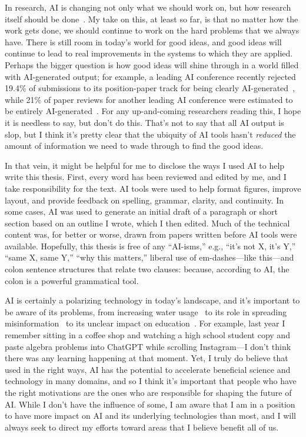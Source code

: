 In research, AI is changing not only what we should work on, but how research itself should be done~\cite{cheng2025barbariansgateaiupending}. My take on this, at least so far, is that no matter how the work gets done, we should continue to work on the hard problems that we always have. There is still room in today's world for good ideas, and good ideas will continue to lead to real improvements in the systems to which they are applied. Perhaps the bigger question is how good ideas will shine through in a world filled with AI-generated output; for example, a leading AI conference recently rejected 19.4\% of submissions to its position-paper track for being clearly AI-generated~\cite{neurips2026_ai_generated_papers}, while 21\% of paper reviews for another leading AI conference were estimated to be entirely AI-generated~\cite{pangram2025_iclr_reviews_ai}. For any up-and-coming researchers reading this, I hope it is needless to say, but don't do this. That's not to say that all AI output is slop, but I think it's pretty clear that the ubiquity of AI tools hasn't \textit{reduced} the amount of information we need to wade through to find the good ideas.

In that vein, it might be helpful for me to disclose the ways I used AI to help write this thesis. First, every word has been reviewed and edited by me, and I take responsibility for the text. AI tools were used to help format figures, improve layout, and provide feedback on spelling, grammar, clarity, and continuity. In some cases, AI was used to generate an initial draft of a paragraph or short section based on an outline I wrote, which I then edited. Much of the technical content was, for better or worse, drawn from papers written before AI tools were available. Hopefully, this thesis is free of any ``AI-isms,'' e.g., ``it's not X, it's Y,'' ``same X, same Y,'' ``why this matters,'' liberal use of em-dashes---like this---and colon sentence structures that relate two clauses: because, according to AI, the colon is a powerful grammatical tool.

AI is certainly a polarizing technology in today's landscape, and it's important to be aware of its problems, from increasing water usage~\cite{aczel2026environmental} to its role in spreading misinformation~\cite{zhou2023misinfo} to its unclear impact on education~\cite{fesler2026evidence}. For example, last year I remember sitting in a coffee shop and watching a high school student copy and paste algebra problems into ChatGPT while scrolling Instagram---I don't think there was any learning happening at that moment. Yet, I truly do believe that used in the right ways, AI has the potential to accelerate beneficial science and technology in many domains, and so I think it's important that people who have the right motivations are the ones who are responsible for shaping the future of AI. While I don't have the influence of some, I am aware that I am in a position to have more impact on AI and its underlying technologies than most, and I will always seek to direct my efforts toward areas that I believe benefit all of us.

